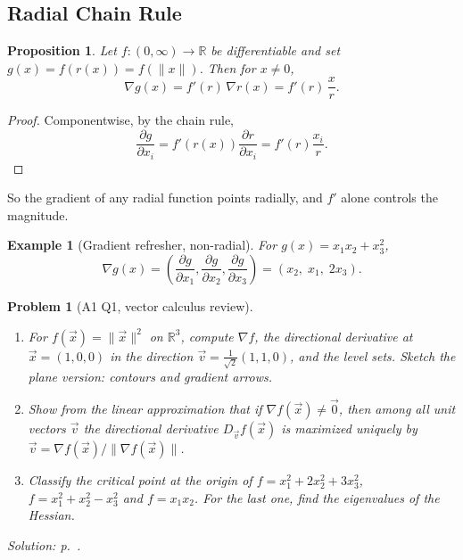 \documentclass{article}
\newtheorem{problem}{Problem}
\newtheorem*{example}{Example}
\newtheorem{proposition}{Proposition}
\newcommand{\R}{\mathbb{R}}
\begin{document}
\subsection{Radial Chain Rule}
\begin{proposition}
    Let $f : (0,\infty) \to \mathbb{R}$ be differentiable and set $g(x) = f(r(x)) = f(\|x\|)$. Then for $x \neq 0$,
    \begin{equation}
        \nabla g(x) = f'(r)\, \nabla r(x) = f'(r)\, \frac{x}{r}.
    \end{equation}
\end{proposition}
\begin{proof}
    Componentwise, by the chain rule,
    \begin{equation}
        \frac{\partial g}{\partial x_i} = f'(r(x)) \frac{\partial r}{\partial x_i} = f'(r) \frac{x_i}{r}.
    \end{equation}
\end{proof}
So the gradient of any radial function points radially, and $f'$ alone controls the magnitude.
\begin{example}[Gradient refresher, non-radial]
    For $g(x) = x_1 x_2 + x_3^2$,
    \begin{equation}
        \nabla g(x) = \left( \frac{\partial g}{\partial x_1}, \frac{\partial g}{\partial x_2}, \frac{\partial g}{\partial x_3} \right) = (x_2,\; x_1,\; 2x_3).
    \end{equation}
\end{example}

\begin{problem}[A1 Q1, vector calculus review]\label{prob:a1-vc}
    \begin{enumerate}[label=(\arabic*)]
        \item For $f(\vec{x}) = \|\vec{x}\|^2$ on $\R^3$, compute $\nabla f$, the directional derivative at $\vec{x} = (1,0,0)$ in the direction $\vec{v} = \frac{1}{\sqrt2}(1,1,0)$, and the level sets. Sketch the plane version: contours and gradient arrows.
        \item Show from the linear approximation that if $\nabla f(\vec{x}) \neq \vec{0}$, then among all unit vectors $\vec{v}$ the directional derivative $D_{\vec{v}}f(\vec{x})$ is maximized uniquely by $\vec{v} = \nabla f(\vec{x})/\|\nabla f(\vec{x})\|$.
        \item Classify the critical point at the origin of $f = x_1^2 + 2x_2^2 + 3x_3^2$, $f = x_1^2 + x_2^2 - x_3^2$ and $f = x_1x_2$. For the last one, find the eigenvalues of the Hessian.
    \end{enumerate}
    \hfill \emph{Solution: p.~\pageref{sol:a1-vc}.}
\end{problem}
\end{document}
